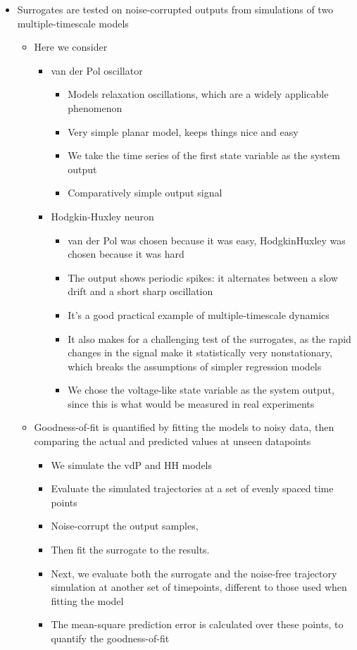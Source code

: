 \documentclass[11pt]{article}
\begin{document}
\begin{itemize}
\item Surrogates are tested on noise-corrupted outputs from simulations of two multiple-timescale models
\begin{itemize}
\item Here we consider
\begin{itemize}
\item van der Pol oscillator
\begin{itemize}
\item Models relaxation oscillations, which are a widely applicable phenomenon
\item Very simple planar model, keeps things nice and easy
\item We take the time series of the first state variable as the system output
\item Comparatively simple output signal
\end{itemize}
\item Hodgkin-Huxley neuron
\begin{itemize}
\item van der Pol was chosen because it was easy, HodgkinHuxley was chosen because it was hard
\item The output shows periodic spikes: it alternates between a slow drift and a short sharp oscillation
\item It's a good practical example of multiple-timescale dynamics
\item It also makes for a challenging test of the surrogates, as the rapid changes in the signal make it statistically very nonstationary, which breaks the assumptions of simpler regression models
\item We chose the voltage-like state variable as the system output, since this is what would be measured in real experiments
\end{itemize}
\end{itemize}

\item Goodness-of-fit is quantified by fitting the models to noisy data, then comparing the actual and predicted values at unseen datapoints
\begin{itemize}
\item We simulate the vdP and HH models
\item Evaluate the simulated trajectories at a set of evenly spaced time points
\item Noise-corrupt the output samples,
\item Then fit the surrogate to the results.
\item Next, we evaluate both the surrogate and the noise-free trajectory simulation at another set of timepoints, different to those used when fitting the model
\item The mean-square prediction error is calculated over these points, to quantify the goodness-of-fit
\end{itemize}
\end{itemize}
\end{itemize}
\end{document}
